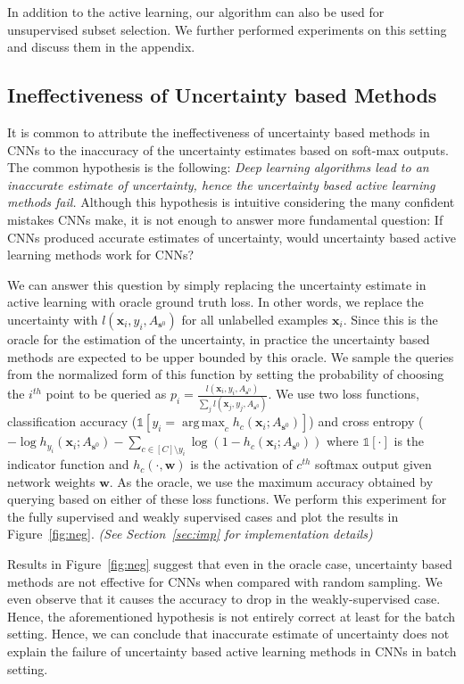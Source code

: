 \documentclass{article} %
\DeclareMathOperator*{\argmax}{arg\,max}
\begin{document}
In addition to the active learning, our algorithm can also be used for unsupervised subset selection. We further performed experiments on this setting and discuss them in the appendix.

\subsection{Ineffectiveness of Uncertainty based Methods} \label{sec:whatif} It is common to attribute the
ineffectiveness of uncertainty based methods in CNNs to the inaccuracy of the uncertainty estimates based on soft-max
outputs. The common hypothesis is the following: \emph{Deep learning algorithms lead to an inaccurate estimate of
uncertainty, hence the uncertainty based active learning methods fail.} Although this hypothesis is intuitive
considering the many confident mistakes CNNs make, it is not enough to answer more fundamental question: If CNNs
produced accurate estimates of uncertainty, would uncertainty based active learning methods work for CNNs?

We can answer this question by simply replacing the uncertainty estimate in active learning with oracle ground truth
loss. In other words, we replace the uncertainty with $l(\mathbf{x}_i,y_i,A_{\mathbf{s}^0})$ for all unlabelled examples
$\mathbf{x}_i$. Since this is the oracle for the estimation of the uncertainty, in practice the uncertainty based
methods are expected to be upper bounded by this oracle. We sample the queries from the normalized form of this function
by setting the probability of choosing the $i^{th}$ point to be queried as
$p_i=\frac{l(\mathbf{x}_i,y_i,A_{\mathbf{s}^0})}{\sum_j l(\mathbf{x}_j,y_j,A_{\mathbf{s}^0})}$. We use two loss
functions, classification accuracy \mbox{($\mathds{1}[y_i = \argmax_c h_c(\mathbf{x}_i;A_{\mathbf{s}^0})]$)} and cross
entropy \mbox{($ - \log h_{y_i}(\mathbf{x}_i;A_{\mathbf{s}^0}) -\sum_{c \in [C] \setminus y_i} \log(1-
h_{c}(\mathbf{x}_i;A_{\mathbf{s}^0}))$} where $\mathds{1}[\cdot]$ is the indicator function and $h_c(\cdot,\mathbf{w})$
is the activation of $c^{th}$ softmax output given network weights $\mathbf{w}$. As the oracle, we use the maximum
accuracy obtained by querying based on either of these loss functions. We perform this experiment for the fully
supervised and weakly supervised cases and plot the results in Figure~\ref{fig:neg}. \emph{(See Section~\ref{sec:imp}
for implementation details)}

Results in Figure~\ref{fig:neg} suggest that even in the oracle case, uncertainty based methods are not effective for
CNNs when compared with random sampling. We even observe that it causes the accuracy to drop in the weakly-supervised
case. Hence, the aforementioned hypothesis is not entirely correct at least for the batch setting. Hence, we can
conclude that inaccurate estimate of uncertainty does not explain the failure of uncertainty based active learning
methods in CNNs in batch setting. 
\end{document}
